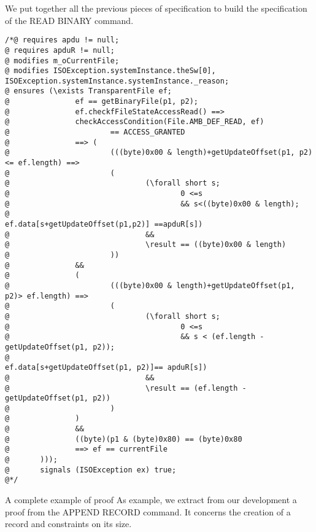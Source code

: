 We put together all the previous pieces of specification to build the specification of the READ BINARY command.
\begin{lstlisting} 
/*@ requires apdu != null;
@ requires apduR != null;
@ modifies m_oCurrentFile;
@ modifies ISOException.systemInstance.theSw[0],
ISOException.systemInstance.systemInstance._reason;
@ ensures (\exists TransparentFile ef;
@               ef == getBinaryFile(p1, p2);
@               ef.checkfFileStateAccessRead() ==>
@               checkAccessCondition(File.AMB_DEF_READ, ef)
@                       == ACCESS_GRANTED
@               ==> (
@                       (((byte)0x00 & length)+getUpdateOffset(p1, p2)<= ef.length) ==>
@                       (
@                               (\forall short s;
@                                       0 <=s
@                                       && s<((byte)0x00 & length);
@                                            ef.data[s+getUpdateOffset(p1,p2)] ==apduR[s])
@                               &&
@                               \result == ((byte)0x00 & length)
@                       ))
@               &&
@               (
@                       (((byte)0x00 & length)+getUpdateOffset(p1, p2)> ef.length) ==>
@                       (
@                               (\forall short s;
@                                       0 <=s
@                                       && s < (ef.length -getUpdateOffset(p1, p2));
@                                               ef.data[s+getUpdateOffset(p1, p2)]== apduR[s])
@                               &&
@                               \result == (ef.length -getUpdateOffset(p1, p2))
@                       )
@               )
@               &&
@               ((byte)(p1 & (byte)0x80) == (byte)0x80
@               ==> ef == currentFile
@       )));
@       signals (ISOException ex) true;
@*/
\end{lstlisting}
A complete example of proof As example, we extract from our
development a proof from the APPEND RECORD command. It concerns 
the creation of a record and constraints on its size.

